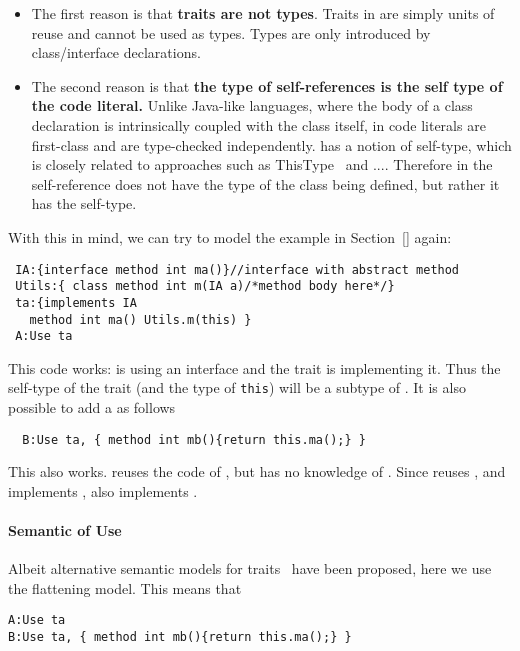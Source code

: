 \begin{itemize}

\item The first reason is that {\bf traits are not types}. Traits in
  \name are simply units of reuse and cannot be used as types. Types
  are only introduced by class/interface declarations.

\item The second reason is that {\bf the type of self-references is the self type of the
    code literal.} Unlike Java-like languages, where the body of a
  class declaration is intrinsically coupled with the class itself, in
  \name code literals are first-class and are type-checked independently.
  \name has a notion of self-type, which is closely related to
  approaches such as ThisType~\cite{} and ...\cite{others}. Therefore
  in \name the self-reference does not have the type of the class
  being defined, but rather it has the self-type.
\end{itemize}

With this in mind, we can try to model the example in Section~\ref{} again:

\begin{lstlisting}
 IA:{interface method int ma()}//interface with abstract method
 Utils:{ class method int m(IA a)/*method body here*/}
 ta:{implements IA
   method int ma() Utils.m(this) }
 A:Use ta
\end{lstlisting}

This code works: \Q@Utils@ is using an interface \Q@IA@ and the trait \Q@ta@
is implementing it. Thus the self-type of the trait \Q@ta@ (and the
type of \lstinline{this}) will be a
subtype of \Q@IA@. It is also possible to add a \Q@B@ as follows
\begin{lstlisting}
  B:Use ta, { method int mb(){return this.ma();} }
\end{lstlisting}
This also works.  \Q@B@ reuses the code of \Q@ta@, but has no knowledge of \Q@A@.
Since \Q@B@ reuses \Q@ta@, and \Q@ta@ implements \Q@IA@, also \Q@B@ implements \Q@IA@. 

\paragraph*{Semantic of Use}
Albeit alternative semantic models for traits~\cite{} have been proposed,
here we use the flattening model.
This means that 
\begin{lstlisting}
A:Use ta
B:Use ta, { method int mb(){return this.ma();} }
\end{lstlisting}
 

